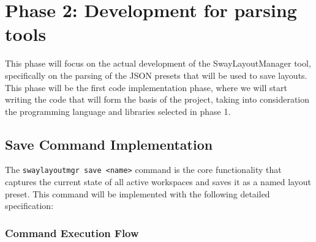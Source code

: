 \newpage

\section{Phase 2: Development for parsing tools}

This phase will focus on the actual development of the SwayLayoutManager tool, specifically on the parsing of the JSON presets that will be used to save layouts. This phase will be the first code implementation phase, where we will start writing the code that will form the basis of the project, taking into consideration the programming language and libraries selected in phase 1.

\subsection{Save Command Implementation}

The \texttt{swaylayoutmgr save <name>} command is the core functionality that captures the current state of all active workspaces and saves it as a named layout preset. This command will be implemented with the following detailed specification:

\subsubsection{Command Execution Flow}

